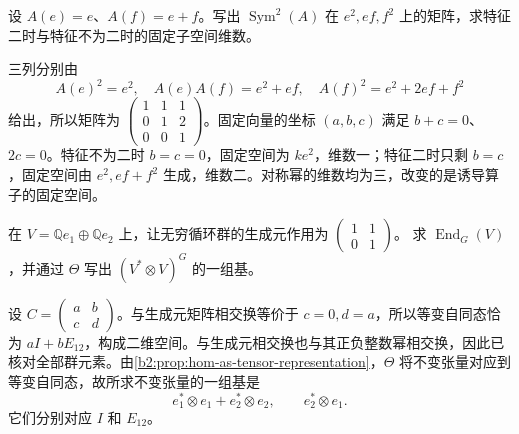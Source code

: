 \begin{exercise}\label{b2:ex:08-symmetric-unipotent-matrix}
	设 \(A(e)=e\)、\(A(f)=e+f\)。写出 \(\operatorname{Sym}^2(A)\) 在 \(e^2,ef,f^2\) 上的矩阵，求特征二时与特征不为二时的固定子空间维数。
\end{exercise}
\begin{solution}
	三列分别由
	\[
		A(e)^2=e^2,\quad A(e)A(f)=e^2+ef,\quad A(f)^2=e^2+2ef+f^2
	\]
	给出，所以矩阵为 \(\begin{pmatrix}1&1&1\\0&1&2\\0&0&1\end{pmatrix}\)。固定向量的坐标 \((a,b,c)\) 满足 \(b+c=0\)、\(2c=0\)。特征不为二时 \(b=c=0\)，固定空间为 \(ke^2\)，维数一；特征二时只剩 \(b=c\)，固定空间由 \(e^2,ef+f^2\) 生成，维数二。对称幂的维数均为三，改变的是诱导算子的固定空间。
\end{solution}

\begin{exercise}\label{b2:ex:08-hom-invariant-jordan}
	在 \(V=\mathbb Qe_1\oplus\mathbb Qe_2\) 上，让无穷循环群的生成元作用为
	\(\begin{pmatrix}1&1\\0&1\end{pmatrix}\)。
	求 \(\operatorname{End}_G(V)\)，并通过 \(\Theta\) 写出 \((V^*\otimes V)^G\) 的一组基。
\end{exercise}
\begin{solution}
	设 \(C=\begin{pmatrix}a&b\\c&d\end{pmatrix}\)。与生成元矩阵相交换等价于 \(c=0,d=a\)，所以等变自同态恰为 \(aI+bE_{12}\)，构成二维空间。与生成元相交换也与其正负整数幂相交换，因此已核对全部群元素。由\cref{b2:prop:hom-as-tensor-representation}，\(\Theta\) 将不变张量对应到等变自同态，故所求不变张量的一组基是
	\[
		e_1^*\otimes e_1+e_2^*\otimes e_2,\qquad e_2^*\otimes e_1.
	\]
	它们分别对应 \(I\) 和 \(E_{12}\)。
\end{solution}

